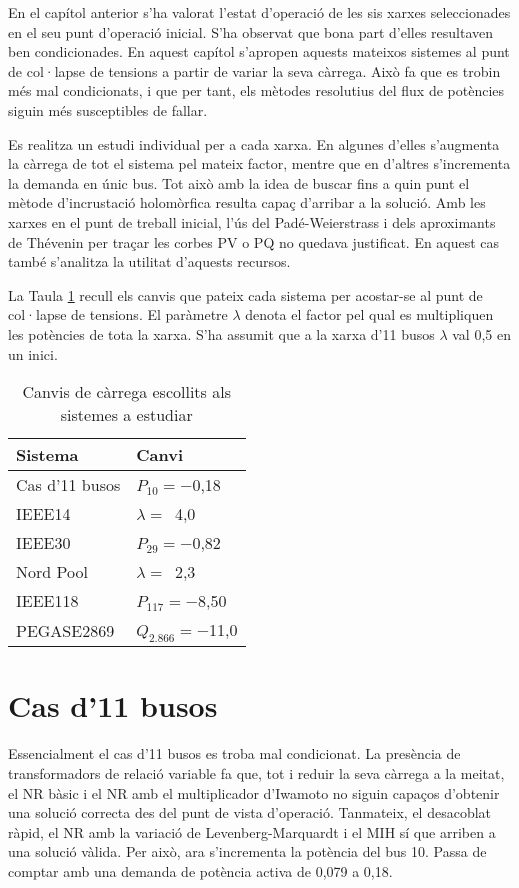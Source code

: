 En el capítol anterior s'ha valorat l'estat d'operació de les sis xarxes seleccionades en el seu punt d'operació inicial. S'ha observat que bona part d'elles resultaven ben condicionades. En aquest capítol s'apropen aquests mateixos sistemes al punt de col·lapse de tensions a partir de variar la seva càrrega. Això fa que es trobin més mal condicionats, i que per tant, els mètodes resolutius del flux de potències siguin més susceptibles de fallar. 

Es realitza un estudi individual per a cada xarxa. En algunes d'elles s'augmenta la càrrega de tot el sistema pel mateix factor, mentre que en d'altres s'incrementa la demanda en únic bus. Tot això amb la idea de buscar fins a quin punt el mètode d'incrustació holomòrfica resulta capaç d'arribar a la solució. Amb les xarxes en el punt de treball inicial, l'ús del Padé-Weierstrass i dels aproximants de Thévenin per traçar les corbes PV o PQ no quedava justificat. En aquest cas també s'analitza la utilitat d'aquests recursos. 

La Taula \ref{tab:canvis_sistemes} recull els canvis que pateix cada sistema per acostar-se al punt de col·lapse de tensions. El paràmetre $\lambda$ denota el factor pel qual es multipliquen les potències de tota la xarxa. S'ha assumit que a la xarxa d'11 busos $\lambda$ val 0,5 en un inici. 

\begin{table}[!htb]
    \begin{center}
    \begin{tabular}{ll}
    \hline
    Sistema & Canvi\\
    \hline
    \hline
    Cas d'11 busos & $P_{10}=-$0,18\\
    IEEE14 & $\lambda=$\ 4,0\\
    IEEE30 & $P_{29}=-$0,82\\
    Nord Pool & $\lambda=$\ 2,3\\
    IEEE118 & $P_{117}=-$8,50\\
    PEGASE2869 & $Q_{2.866}=-$11,0\\ 
    \hline 
    \end{tabular}
    \caption{Canvis de càrrega escollits als sistemes a estudiar}
    \label{tab:canvis_sistemes}
    \end{center}
  \end{table}

\section{Cas d'11 busos}
Essencialment el cas d'11 busos es troba mal condicionat. La presència de transformadors de relació variable fa que, tot i reduir la seva càrrega a la meitat, el NR bàsic i el NR amb el multiplicador d'Iwamoto no siguin capaços d'obtenir una solució correcta des del punt de vista d'operació. Tanmateix, el desacoblat ràpid, el NR amb la variació de Levenberg-Marquardt i el MIH sí que arriben a una solució vàlida. Per això, ara s'incrementa la potència del bus 10. Passa de comptar amb una demanda de potència activa de 0,079 a 0,18.


